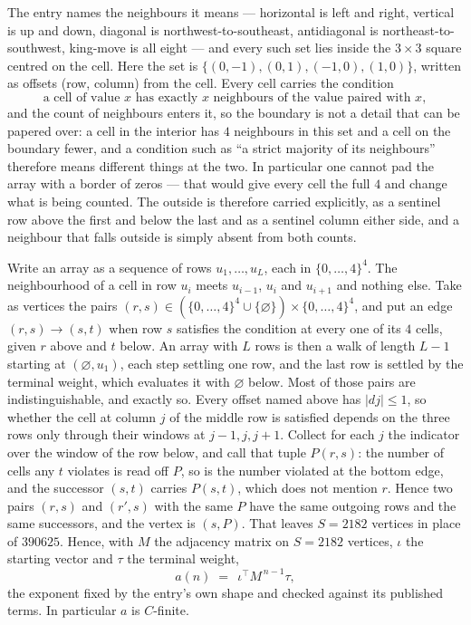 \documentclass[11pt,a4paper]{article}
\theoremstyle{plain}
\theoremstyle{definition}
\begin{document}
The entry names the neighbours it means --- horizontal is left and right, vertical is up and
down, diagonal is northwest-to-southeast, antidiagonal is northeast-to-southwest, king-move is
all eight --- and every such set lies inside the $3\times3$ square centred on the cell. Here
the set is $\{(0,-1), (0,1), (-1,0), (1,0)\}$, written as offsets (row, column) from the cell. Every cell carries
the condition
\[
\text{a cell of value }x\text{ has exactly }x\text{ neighbours of the value paired with }x,
\]
and the count of neighbours enters it, so the boundary is not a detail that can be papered
over: a cell in the interior has $4$ neighbours in this set and a cell on the boundary
fewer, and a condition such as ``a strict majority of its neighbours'' therefore means
different things at the two. In particular one cannot pad the array with a border of zeros ---
that would give every cell the full $4$ and change what is being counted. The outside is
therefore carried
explicitly, as a sentinel row above the first and below the last and as a sentinel column
either side, and a neighbour that falls outside is simply absent from both counts.

Write an array as a sequence of rows $u_1,\dots,u_L$, each in
$\{0,\dots,4\}^{4}$. The neighbourhood of a cell in row $u_i$ meets $u_{i-1}$,
$u_i$ and $u_{i+1}$ and nothing else. Take as vertices the pairs
$(r,s)\in(\{0,\dots,4\}^{4}\cup\{\varnothing\})\times\{0,\dots,4\}^{4}$,
and put an edge $(r,s)\to(s,t)$ when row $s$ satisfies the condition at every one of its
$4$ cells, given $r$ above and $t$ below. An array with $L$ rows is then a walk of length
$L-1$ starting at $(\varnothing,u_1)$, each step settling one row, and the last row is
settled by the terminal weight, which evaluates it with $\varnothing$ below. Most of those pairs are indistinguishable, and exactly so. Every offset named above has $|dj|\le 1$, so whether the cell at column $j$ of the middle row is satisfied depends on the three rows only through their windows at $j-1,j,j+1$. Collect for each $j$ the indicator over the window of the row below, and call that tuple $P(r,s)$: the number of cells any $t$ violates is read off $P$, so is the number violated at the bottom edge, and the successor $(s,t)$ carries $P(s,t)$, which does not mention $r$. Hence two pairs $(r,s)$ and $(r',s)$ with the same $P$ have the same outgoing rows and the same successors, and the vertex is $(s,P)$. That leaves $S=2182$ vertices in place of $390625$. Hence,
with $M$ the adjacency matrix on $S=2182$ vertices, $\iota$ the starting vector and $\tau$ the
terminal weight,
\[
a(n)\;=\;\,\iota^{\!\top}M^{\,n-1}\tau ,
\]
the exponent fixed by the entry's own shape and checked against its published terms. In
particular $a$ is $C$-finite.
\end{document}
